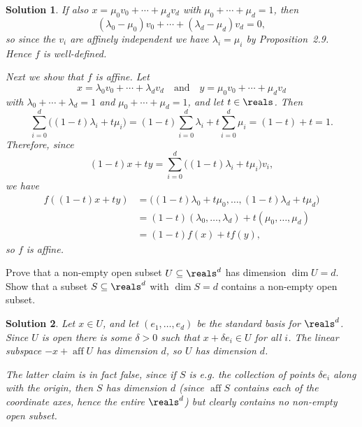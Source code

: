 \documentclass[article, a4paper, 11pt, oneside]{memoir}
\numberwithin{equation}{chapter}
\theoremstyle{nonumberplain}
\newtheorem{solution}{Solution}
\newcommand{\aff}{\operatorname{aff}}
\begin{document}
\begin{solution}
    If also $x = \mu_0 v_0 + \cdots + \mu_d v_d$ with $\mu_0 + \cdots + \mu_d = 1$, then
    \begin{equation*}
        (\lambda_0 - \mu_0) v_0 + \cdots + (\lambda_d - \mu_d) v_d
            = 0,
    \end{equation*}
    so since the $v_i$ are affinely independent we have $\lambda_i = \mu_i$ by Proposition~2.9. Hence $f$ is well-defined.

    Next we show that $f$ is affine. Let
    \begin{equation*}
        x = \lambda_0 v_0 + \cdots + \lambda_d v_d
        \quad \text{and} \quad
        y = \mu_0 v_0 + \cdots + \mu_d v_d
    \end{equation*}
    with $\lambda_0 + \cdots + \lambda_d = 1$ and $\mu_0 + \cdots + \mu_d = 1$, and let $t \in \reals$. Then
    \begin{equation*}
        \sum_{i=0}^d \bigl( (1-t)\lambda_i + t\mu_i \bigr)
            = (1-t) \sum_{i=0}^d\lambda_i + t \sum_{i=0}^d\mu_i
            = (1-t) + t
            = 1.
    \end{equation*}
    Therefore, since
    \begin{equation*}
        (1-t)x + ty
            = \sum_{i=0}^d \bigl( (1-t)\lambda_i + t\mu_i \bigr) v_i,
    \end{equation*}
    we have
    \begin{align*}
        f((1-t)x + ty)
            &= \bigl( (1-t)\lambda_0 + t\mu_0, \ldots, (1-t)\lambda_d + t\mu_d \bigr) \\
            &= (1-t)(\lambda_0, \ldots, \lambda_d) + t(\mu_0, \ldots, \mu_d) \\
            &= (1-t)f(x) + tf(y),
    \end{align*}
    so $f$ is affine.
\end{solution}


\begin{exerciseframed*}[12]
    Prove that a non-empty open subset $U \subseteq \reals^d$ has dimension $\dim U = d$. Show that a subset $S \subseteq \reals^d$ with $\dim S = d$ contains a non-empty open subset.
\end{exerciseframed*}

\begin{solution}
    Let $x \in U$, and let $(e_1, \ldots, e_d)$ be the standard basis for $\reals^d$. Since $U$ is open there is some $\delta > 0$ such that $x + \delta e_i \in U$ for all $i$. The linear subspace $-x + \aff U$ has dimension $d$, so $U$ has dimension $d$.

    The latter claim is in fact false, since if $S$ is e.g. the collection of points $\delta e_i$ along with the origin, then $S$ has dimension $d$ (since $\aff S$ contains each of the coordinate axes, hence the entire $\reals^d$) but clearly contains no non-empty open subset.
\end{solution}
\end{document}
